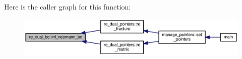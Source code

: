 Here is the caller graph for this function\+:\nopagebreak
\begin{figure}[H]
\begin{center}
\leavevmode
\includegraphics[width=350pt]{namespacere__dual__bc_ab0840c2415aee6d7acfdbeead7212aed_icgraph}
\end{center}
\end{figure}


